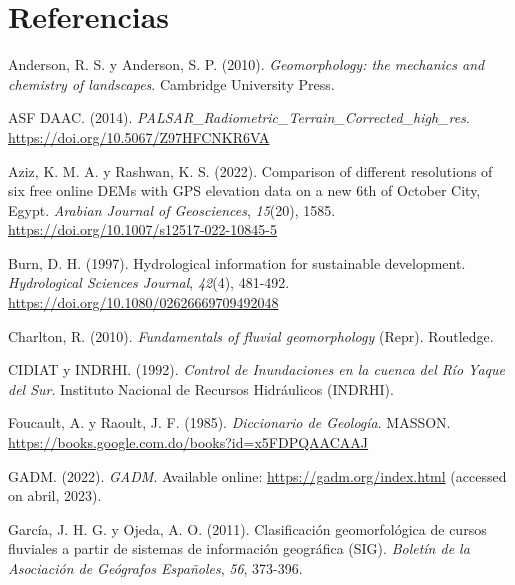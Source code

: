\documentclass[spanish]{article}
\newlength{\cslhangindent}
\newlength{\cslentryspacingunit} %
\newenvironment{CSLReferences}[2] %
 {%
  \setlength{\parindent}{0pt}
  \ifodd #1
  \let\oldpar\par
  \def\par{\hangindent=\cslhangindent\oldpar}
  \fi
  \setlength{\parskip}{#2\cslentryspacingunit}
 }%
 {}
\begin{document}
\hypertarget{referencias}{%
\section*{Referencias}\label{referencias}}

\hypertarget{refs}{}
\begin{CSLReferences}{1}{0}
\leavevmode{}%
Anderson, R. S. y Anderson, S. P. (2010). \emph{Geomorphology: the
mechanics and chemistry of landscapes}. Cambridge University Press.

\leavevmode{}%
ASF DAAC. (2014).
\emph{PALSAR{\_}Radiometric{\_}Terrain{\_}Corrected{\_}high{\_}res}.
\url{https://doi.org/10.5067/Z97HFCNKR6VA}

\leavevmode{}%
Aziz, K. M. A. y Rashwan, K. S. (2022). Comparison of different
resolutions of six free online DEMs with GPS elevation data on a new 6th
of October City, Egypt. \emph{Arabian Journal of Geosciences},
\emph{15}(20), 1585. \url{https://doi.org/10.1007/s12517-022-10845-5}

\leavevmode{}%
Burn, D. H. (1997). Hydrological information for sustainable
development. \emph{Hydrological Sciences Journal}, \emph{42}(4),
481-492. \url{https://doi.org/10.1080/02626669709492048}

\leavevmode{}%
Charlton, R. (2010). \emph{Fundamentals of fluvial geomorphology}
(Repr). Routledge.

\leavevmode{}%
CIDIAT y INDRHI. (1992). \emph{{Control de Inundaciones en la cuenca del
Río Yaque del Sur}}. {Instituto Nacional de Recursos Hidráulicos
(INDRHI)}.

\leavevmode{}%
Foucault, A. y Raoult, J. F. (1985). \emph{Diccionario de Geología}.
MASSON. \url{https://books.google.com.do/books?id=x5FDPQAACAAJ}

\leavevmode{}%
GADM. (2022). \emph{{GADM}}. Available online:
\url{https://gadm.org/index.html} (accessed on abril, 2023).

\leavevmode{}%
García, J. H. G. y Ojeda, A. O. (2011). Clasificación geomorfológica de
cursos fluviales a partir de sistemas de información geográfica (SIG).
\emph{Boletín de la Asociación de Geógrafos Españoles}, \emph{56},
373-396.


\end{CSLReferences}
\end{document}
